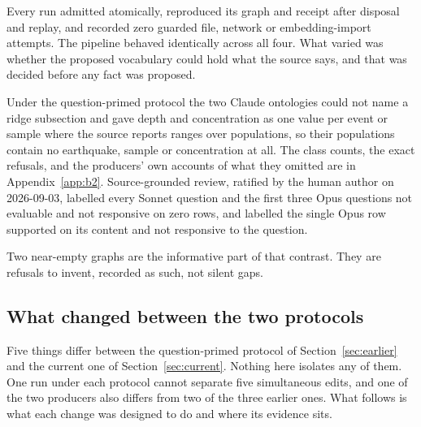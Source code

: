 \documentclass[10pt]{article}
\begin{document}
Every run admitted atomically, reproduced its graph and receipt after disposal and replay, and recorded zero guarded file, network or embedding-import attempts. The pipeline behaved identically across all four. What varied was whether the proposed vocabulary could hold what the source says, and that was decided before any fact was proposed.

Under the question-primed protocol the two Claude ontologies could not name a ridge subsection and gave depth and concentration as one value per event or sample where the source reports ranges over populations, so their populations contain no earthquake, sample or concentration at all. The class counts, the exact refusals, and the producers' own accounts of what they omitted are in Appendix~\ref{app:b2}. Source-grounded review, ratified by the human author on 2026-09-03, labelled every Sonnet question and the first three Opus questions not evaluable and not responsive on zero rows, and labelled the single Opus row supported on its content and not responsive to the question.

Two near-empty graphs are the informative part of that contrast. They are refusals to invent, recorded as such, not silent gaps.

\subsection{What changed between the two protocols}
\label{sec:changed}

Five things differ between the question-primed protocol of Section~\ref{sec:earlier} and the current one of Section~\ref{sec:current}. Nothing here isolates any of them. One run under each protocol cannot separate five simultaneous edits, and one of the two producers also differs from two of the three earlier ones. What follows is what each change was designed to do and where its evidence sits.
\end{document}
